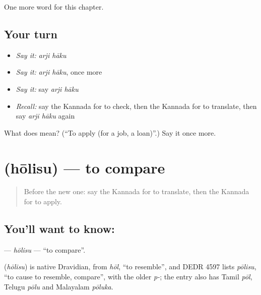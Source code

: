 \begin{grammarlens}[title={What you've built}]
One more word for this chapter.
\end{grammarlens}

\subsection*{Your turn}
\begin{itemize}
\raggedright
  \item \emph{Say it:} \emph{arji hāku}
  \item \emph{Say it:} \emph{arji hāku}, once more
  \item \emph{Say it:} say \emph{arji hāku}
  \item \emph{Recall:} say the Kannada for to check, then the Kannada for to translate, then say \emph{arji hāku} again
\end{itemize}

\begin{tcolorbox}[breakable,colback=teal!4,colframe=teal!35!black,title={Before you move on}]
What does   mean? (\textquotedblleft{}To apply (for a job, a loan)\textquotedblright{}.) Say it once more.
\end{tcolorbox}
\section[\texorpdfstring{\kn{ಹೋಲಿಸು} (hōlisu)}{ಹೋಲಿಸು (hōlisu)}]{ (hōlisu) — to compare}

\label{lesson:KA-C275-holisu}



\begin{quote}
Before the new one: say the Kannada for to translate, then the Kannada for to apply.
\end{quote}

\subsection*{You'll want to know: }
\textbf{} — \emph{hōlisu} — \textquotedblleft{}to compare\textquotedblright{}.

\begin{cousinweb}
\textbf{} (\emph{hōlisu}) is native Dravidian, from \emph{hōl}, \textquotedblleft{}to resemble\textquotedblright{}, and DEDR 4597 lists \emph{pōlisu}, \textquotedblleft{}to cause to resemble, compare\textquotedblright{}, with the older \emph{p-}; the entry also has Tamil \emph{pōl}, Telugu \emph{pōlu} and Malayalam \emph{pōluka}.
\end{cousinweb}

